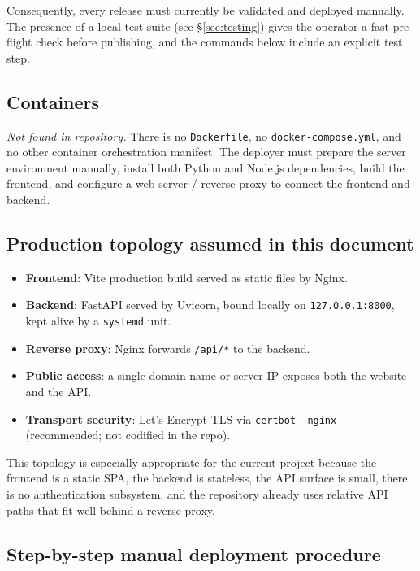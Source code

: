 \documentclass[11pt,a4paper]{article}
\begin{document}
Consequently, every release must currently be validated and deployed
manually. The presence of a local test suite (see \S\ref{sec:testing}) gives
the operator a fast pre-flight check before publishing, and the commands
below include an explicit test step.

\subsection{Containers}
\emph{Not found in repository.} There is no \texttt{Dockerfile}, no
\texttt{docker-compose.yml}, and no other container orchestration manifest.
The deployer must prepare the server environment manually, install both
Python and Node.js dependencies, build the frontend, and configure a web
server / reverse proxy to connect the frontend and backend.

\subsection{Production topology assumed in this document}
\label{subsec:production_topology}

\begin{itemize}[leftmargin=1.6em]
  \item \textbf{Frontend}: Vite production build served as static files by
        Nginx.
  \item \textbf{Backend}: FastAPI served by Uvicorn, bound locally on
        \texttt{127.0.0.1:8000}, kept alive by a \texttt{systemd} unit.
  \item \textbf{Reverse proxy}: Nginx forwards \texttt{/api/*} to the
        backend.
  \item \textbf{Public access}: a single domain name or server IP exposes
        both the website and the API.
  \item \textbf{Transport security}: Let's Encrypt TLS via
        \texttt{certbot --nginx} (recommended; not codified in the repo).
\end{itemize}

This topology is especially appropriate for the current project because the
frontend is a static SPA, the backend is stateless, the API surface is small,
there is no authentication subsystem, and the repository already uses
relative API paths that fit well behind a reverse proxy.

\subsection{Step-by-step manual deployment procedure}
\label{subsec:detailed_manual_deployment}
\end{document}
